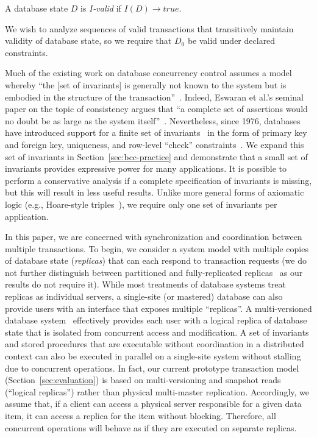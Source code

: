 \begin{definition}
A database state $D$ is \textit{$I$-valid} if $I(D) \rightarrow true$.
\end{definition}

We wish to analyze sequences of valid transactions that transitively
maintain validity of database state, so we require that $D_0$ be valid
under declared constraints.

 Much of the existing work on
database concurrency control assumes a model whereby ``the [set of
  invariants] is generally not known to the system but is embodied in
the structure of the transaction''~\cite{traiger-tods}. Indeed,
Eswaran et al.'s seminal paper on the topic of consistency argues that
``a complete set of assertions would no doubt be as large as the
system itself''~\cite{eswaran-consistency}. Nevertheless, since 1976,
databases have introduced support for a finite set of
invariants~\cite{korth-serializability} in the form of primary key and
foreign key, uniqueness, and row-level ``check''
constraints~\cite{kemme-si-ic}. We expand this set of invariants in
Section~\ref{sec:bcc-practice} and demonstrate that a small set of
invariants provides expressive power for many applications. It is
possible to perform a conservative analysis if a complete
specification of invariants is missing, but this will result in less
useful results. Unlike more general forms of axiomatic logic (e.g.,
Hoare-style triples~\cite{decomp-semantics}), we require only one set
of invariants per application.\vspace{.5em}

 In this paper, we are concerned with
synchronization and coordination between multiple transactions. To
begin, we consider a system model with multiple copies of database
state (\textit{replicas}) that can each respond to transaction
requests (we do not further distinguish between partitioned and
fully-replicated replicas~\cite{hat-vldb} as our results do not
require it). While most treatments of database systems treat replicas
as individual servers, a single-site (or mastered) database can also
provide users with an interface that exposes multiple ``replicas''. A
multi-versioned database system~\cite{bernstein-book} effectively
provides each user with a logical replica of database state that is
isolated from concurrent access and modification. A set of invariants
and stored procedures that are executable without coordination in a
distributed context can also be executed in parallel on a single-site
system without stalling due to concurrent operations.  In fact, our
current prototype transaction model (Section~\ref{sec:evaluation}) is
based on multi-versioning and snapshot reads (``logical replicas'')
rather than physical multi-master replication. Accordingly, we assume
that, if a client can access a physical server responsible for a given
data item, it can access a replica for the item without
blocking. Therefore, all concurrent operations will behave as if they
are executed on separate replicas.

